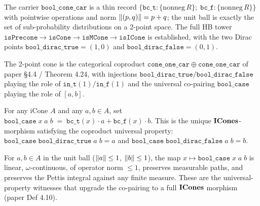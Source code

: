 \begin{definition}\label{def:cbv-bool-cone}
\rocqok
{}\rocqok
{}\rocqok
{}
The carrier $\mathtt{bool\_cone\_car}$ is a thin record
$\{\mathtt{bc\_t} : \{\mathrm{nonneg}\,R\};\; \mathtt{bc\_f} :
\{\mathrm{nonneg}\,R\}\}$ with pointwise operations and norm
$\lVert (p, q) \rVert = p + q$; the unit ball is exactly the set of
sub-probability distributions on a 2-point space. The full HB tower
$\mathtt{isPrecone} \to \mathtt{isCone} \to \mathtt{isMCone} \to
\mathtt{isICone}$ is established, with the two Dirac points
$\mathtt{bool\_dirac\_true} = (1, 0)$ and
$\mathtt{bool\_dirac\_false} = (0, 1)$.
\end{definition}

\begin{remark}
\rocqok
{}\rocqok
The 2-point cone is the categorical coproduct
$\mathtt{cone\_one\_car} \oplus \mathtt{cone\_one\_car}$ of paper
\S4.4 / Theorem 4.24, with injections
$\mathtt{bool\_dirac\_true} / \mathtt{bool\_dirac\_false}$ playing the
role of $\mathtt{in\_t}(1) / \mathtt{in\_f}(1)$ and the universal
co-pairing $\mathtt{bool\_case}$ playing the role of $[a, b]$.
\end{remark}

\begin{definition}\label{def:cbv-bool-case}
\rocqok
{}
For any iCone $A$ and any $a, b \in A$, set
$\mathtt{bool\_case}\;x\;a\;b\;=\;\mathtt{bc\_t}(x)\cdot a +
\mathtt{bc\_f}(x)\cdot b$. This is the unique
$\mathbf{ICones}$-morphism satisfying the coproduct universal property:
$\mathtt{bool\_case}\;\mathtt{bool\_dirac\_true}\;a\;b = a$ and
$\mathtt{bool\_case}\;\mathtt{bool\_dirac\_false}\;a\;b = b$.
\end{definition}

\begin{lemma}\label{lem:cbv-bool-case-witnesses}
\rocqok
{}\rocqok
{}\rocqok
{}\rocqok
{}\rocqok
{}
For $a, b \in A$ in the unit ball ($\lVert a \rVert \leq 1$, $\lVert b \rVert \leq 1$),
the map $x \mapsto \mathtt{bool\_case}\;x\;a\;b$ is linear, $\omega$-continuous,
of operator norm $\leq 1$, preserves measurable paths, and preserves
the Pettis integral against any finite measure. These are the
universal-property witnesses that upgrade the co-pairing to a full
$\mathbf{ICones}$ morphism (paper Def 4.10).
\end{lemma}

